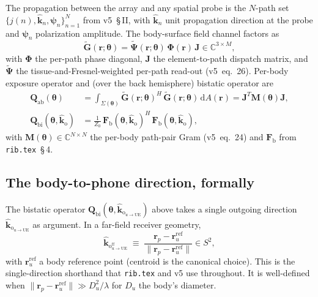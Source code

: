 \documentclass[11pt,a4paper]{article}
\theoremstyle{definition}
\newcommand{\khat}{\hat{\bm{k}}}
\newcommand{\rr}{\mathbf{r}}
\newcommand{\diff}{\mathrm{d}}
\newcommand{\Complex}{\mathbb{C}}
\newcommand{\Gtil}{\tilde{\mathbf{G}}}
\newcommand{\Qabs}{\mathbf{Q}_{\mathrm{ab}}}
\newcommand{\Frib}{\mathbf{F}_{\mathrm{b}}}
\newcommand{\Phimat}{\mathbf{\Phi}}
\newcommand{\Mmat}{\mathbf{M}}
\newcommand{\Jmat}{\mathbf{J}}
\newcommand{\thetab}{\bm{\theta}}
\newcommand{\kout}{\hat{\bm{k}}_{\mathrm{o}}}
\begin{document}
The propagation between the array and any spatial probe is the
$N$-path set $\{j(n),\khat_n,\bm\psi_n\}_{n=1}^N$ from v5~\S\,II,
with $\khat_n$ unit propagation direction at the probe and
$\bm\psi_n$ polarization amplitude.  The body-surface field channel
factors as
\begin{equation}\label{eq:Gtilde}
  \Gtil(\rr;\thetab)=\tilde{\bm\Psi}(\rr;\thetab)\,
                     \Phimat(\rr)\,\Jmat\in\Complex^{3\times M},
\end{equation}
with $\Phimat$ the per-path phase diagonal, $\Jmat$ the
element-to-path dispatch matrix, and $\tilde{\bm\Psi}$ the
tissue-and-Fresnel-weighted per-path read-out (v5~eq.~26).  Per-body
exposure operator and (over the back hemisphere) bistatic operator
are
\begin{align}
  \Qabs(\thetab)
  &= \int_{\Sigma(\thetab)}\Gtil(\rr;\thetab)^H\,\Gtil(\rr;\thetab)\,\diff A(\rr)
  =\Jmat^T\Mmat(\thetab)\Jmat,
  \label{eq:Qabs-def}\\
  \mathbf{Q}_{\mathrm{bi}}(\thetab,\kout)
  &=\frac{1}{Z_0}\,\Frib(\thetab,\kout)^H\,\Frib(\thetab,\kout),
  \label{eq:Qbist-def}
\end{align}
with $\Mmat(\thetab)\in\Complex^{N\times N}$ the per-body path-pair
Gram (v5~eq.~24) and $\Frib$ from \texttt{rib.tex}~\S\,4.

\subsection{The body-to-phone direction, formally}\label{sec:body-phone-dir}

The bistatic operator
$\mathbf{Q}_{\mathrm{bi}}(\thetab,\kout_{u\to\mathrm{UE}})$ above
takes a single outgoing direction $\kout_{u\to\mathrm{UE}}$ as
argument.  In a far-field receiver geometry,
\begin{equation}\label{eq:kout-ff}
  \kout_{u\to\mathrm{UE}}^{\mathrm{ff}}
  \;\equiv\;\frac{\rr_p-\rr_u^{\mathrm{ref}}}
                  {\|\rr_p-\rr_u^{\mathrm{ref}}\|}
  \in S^2,
\end{equation}
with $\rr_u^{\mathrm{ref}}$ a body reference point (centroid is the
canonical choice).  This is the single-direction shorthand that
\texttt{rib.tex} and v5 use throughout.  It is well-defined when
$\|\rr_p-\rr_u^{\mathrm{ref}}\|\gg D_u^2/\lambda$ for $D_u$ the
body's diameter.
\end{document}
